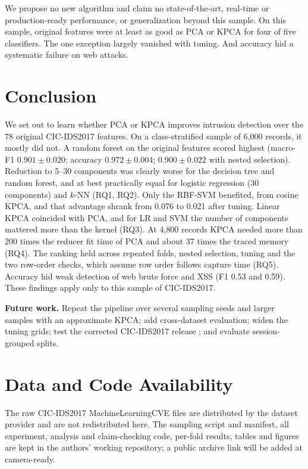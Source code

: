 \documentclass[runningheads]{llncs}
\begin{document}
We propose no new algorithm and claim no state-of-the-art, real-time or production-ready performance, or generalization beyond this sample. On this sample, original features were at least as good as PCA or KPCA for four of five classifiers. The one exception largely vanished with tuning. And accuracy hid a systematic failure on web attacks.

\section{Conclusion}
We set out to learn whether PCA or KPCA improves intrusion detection over the 78 original CIC-IDS2017 features. On a class-stratified sample of 6{,}000 records, it mostly did not. A random forest on the original features scored highest (macro-F1 $0.901\pm0.020$; accuracy $0.972\pm0.004$; $0.900\pm0.022$ with nested selection). Reduction to 5--30 components was clearly worse for the decision tree and random forest, and at best practically equal for logistic regression (30 components) and $k$-NN (RQ1, RQ2). Only the RBF-SVM benefited, from cosine KPCA, and that advantage shrank from 0.076 to 0.021 after tuning. Linear KPCA coincided with PCA, and for LR and SVM the number of components mattered more than the kernel (RQ3). At 4{,}800 records KPCA needed more than 200 times the reducer fit time of PCA and about 37 times the traced memory (RQ4). The ranking held across repeated folds, nested selection, tuning and the two row-order checks, which assume row order follows capture time (RQ5). Accuracy hid weak detection of web brute force and XSS (F1 0.53 and 0.59). These findings apply only to this sample of CIC-IDS2017.

\textbf{Future work.} Repeat the pipeline over several sampling seeds and larger samples with an approximate KPCA; add cross-dataset evaluation; widen the tuning grids; test the corrected CIC-IDS2017 release \cite{engelen2021}; and evaluate session-grouped splits.


\section*{Data and Code Availability}
The raw CIC-IDS2017 MachineLearningCVE files are distributed by the dataset provider \cite{sharafaldin2018} and are not redistributed here. The sampling script and manifest, all experiment, analysis and claim-checking code, per-fold results, tables and figures are kept in the authors' working repository; a public archive link will be added at camera-ready.
\end{document}
